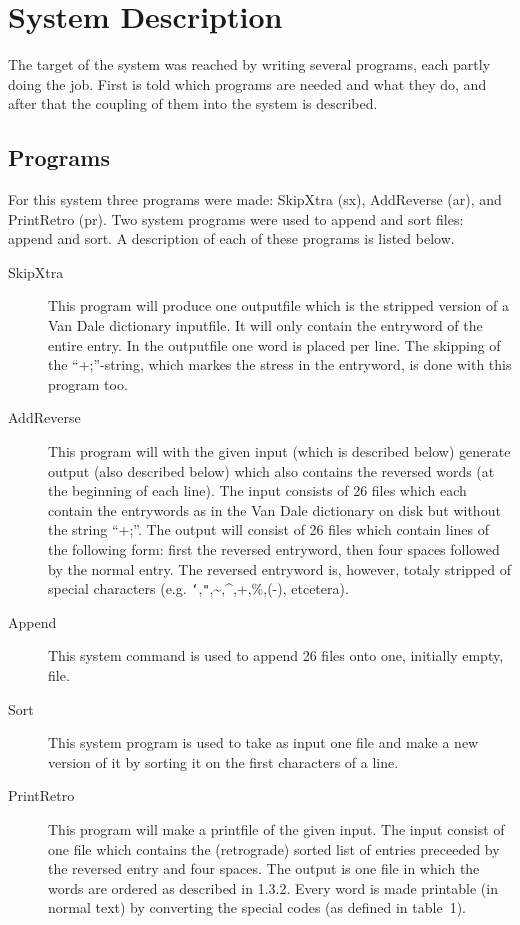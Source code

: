 \section{System Description}
The target of the system was reached by writing several programs, each partly 
doing the job.
First is told which programs are needed and what they do, and after that the 
coupling of them into the system is described.
\subsection{Programs}
For this system three programs were made: SkipXtra (sx), AddReverse (ar), and 
PrintRetro (pr). Two system programs were used to append and sort files: append 
and sort. A description of each of these programs is listed below.
\begin{description}
  \item [SkipXtra] This program will produce one outputfile which is the 
        stripped version of a Van Dale dictionary inputfile. It will only 
        contain the entryword of the entire entry. In the outputfile one word 
        is placed per line. The skipping of the ``+;''-string, which markes the 
        stress in the entryword, is done with this program too.
  \item [AddReverse] This program will with the given input (which is described 
        below) generate output (also described below) which also contains the 
        reversed words (at the beginning of each line). The input consists of 
        26 files which each contain the entrywords as in the Van Dale 
        dictionary on disk but without the string ``+;''. The output will 
        consist of 26 files which contain lines of the following form: first 
        the reversed entryword, then four spaces followed by the normal entry. 
        The reversed entryword is, however, totaly stripped of special 
        characters (e.g. {\tt`},{\tt"},\~{},\^{},+,\%,(-), etcetera). 
  \item [Append] This system command is used to append 26 files onto one, 
        initially empty, file.
  \item [Sort] This system program is used to take as input one file and make a 
        new version of it by sorting it on the first characters of a line.
  \item [PrintRetro]
        This program will make a printfile of the given input. The input 
        consist of one file which contains the (retrograde) sorted list of 
        entries preceeded by the reversed entry and four spaces. The output is 
        one file in which the words are ordered as described in 1.3.2. Every 
        word is made printable (in normal text) by converting the special codes 
        (as defined in table~1).
\end{description}
